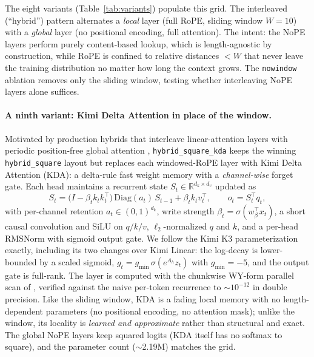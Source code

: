 \documentclass[10pt]{article}
\begin{document}
The eight variants (Table~\ref{tab:variants}) populate this grid. The
interleaved (``hybrid'') pattern alternates a \emph{local} layer (full RoPE, sliding window $W=10$) with a \emph{global} layer (no positional encoding, full attention). The intent: the NoPE layers perform
purely content-based lookup, which is length-agnostic by construction,
while RoPE is confined to relative distances $<W$ that never leave the
training distribution no matter how long the context grows. The
\texttt{nowindow} ablation removes only the sliding window, testing
whether interleaving NoPE layers alone suffices.

\paragraph{A ninth variant: Kimi Delta Attention in place of the window.}
Motivated by production hybrids that interleave linear-attention layers
with periodic position-free global attention
\citep{kimiteam2025linear,kimiteam2026k3}, \texttt{hybrid\_square\_kda}
keeps the winning \texttt{hybrid\_square} layout but replaces each
windowed-RoPE layer with Kimi Delta Attention (KDA): a delta-rule fast
weight memory \citep{schlag2021linear,yang2024gated} with a
\emph{channel-wise} forget gate. Each head maintains a recurrent state
$S_t \in \mathbb{R}^{d_k \times d_v}$ updated as
\begin{equation}
S_t = \bigl(I - \beta_t k_t k_t^{\top}\bigr)\,\mathrm{Diag}(a_t)\,S_{t-1}
      + \beta_t k_t v_t^{\top},
\qquad o_t = S_t^{\top} q_t,
\end{equation}
with per-channel retention $a_t \in (0,1)^{d_k}$, write strength
$\beta_t = \sigma(w_\beta^{\top} x_t)$, a short causal convolution and
SiLU on $q/k/v$, $\ell_2$-normalized $q$ and $k$, and a per-head RMSNorm
with sigmoid output gate. We follow the Kimi K3 parameterization
\citep{kimiteam2026k3} exactly, including its two changes over Kimi
Linear: the log-decay is lower-bounded by a scaled sigmoid,
$g_t = g_{\min}\,\sigma(e^{A_h} z_t)$ with $g_{\min} = -5$, and the
output gate is full-rank. The layer is computed with the chunkwise
WY-form parallel scan of \citet{kimiteam2025linear}, verified against
the naive per-token recurrence to $\sim$$10^{-12}$ in double precision.
Like the sliding window, KDA is a fading local memory with no
length-dependent parameters (no positional encoding, no attention mask);
unlike the window, its locality is \emph{learned and approximate} rather
than structural and exact. The global NoPE layers keep squared logits
(KDA itself has no softmax to square), and the parameter count
($\sim$2.19M) matches the grid.
\end{document}
